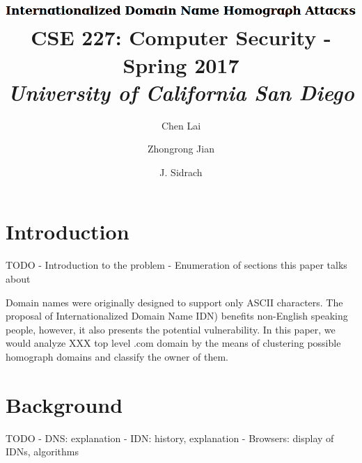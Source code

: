 \documentclass[letterpaper,twocolumn,10pt]{article}
\begin{document}
\date{}

\title{\Large
\includegraphics[height=\baselineskip]{title.png}
\\ \vspace{0.65mm} \large \normalfont
CSE 227: Computer Security - Spring 2017 \\ \textit{
University of California San Diego
}}

\author{
{\rm Chen Lai}\\
\and
{\rm Zhongrong Jian}\\
\and
{\rm J. Sidrach}\\
}

\maketitle


\section{Introduction}
TODO
- Introduction to the problem
- Enumeration of sections this paper talks about

Domain names were originally designed to support only ASCII characters.
The proposal of Internationalized Domain Name IDN) benefits non-English speaking people, however, it also presents the potential vulnerability.
In this paper, we would analyze XXX top level .com domain by the means of clustering possible homograph domains and classify the owner of them.

\section{Background}
TODO
- DNS: explanation
- IDN: history, explanation
- Browsers: display of IDNs, algorithms
\end{document}
